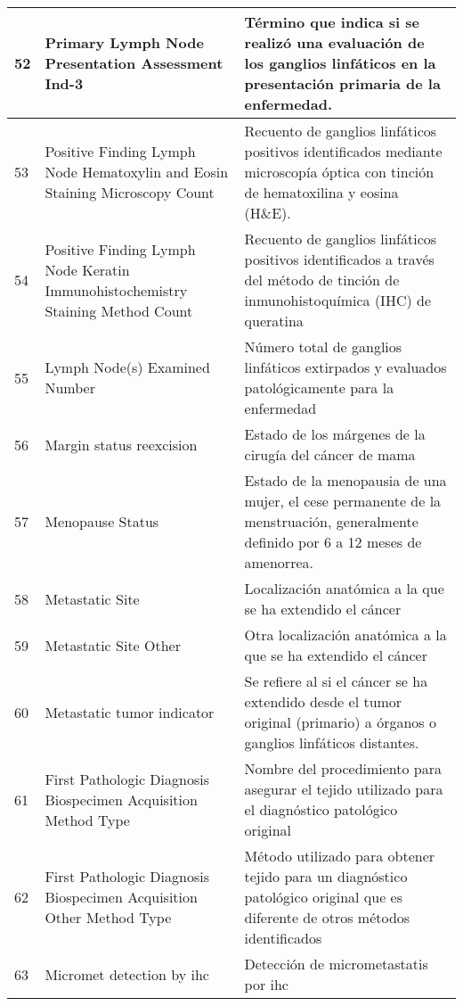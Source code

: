 \begin{table*} [!htb]
	\footnotesize
	\begin{threeparttable}
		\begin{tabular}{p{1cm} p{4cm} p{10cm}}
			\\ \hline	52	&	Primary Lymph Node Presentation Assessment Ind-3	&	Término que indica si se realizó una evaluación de los ganglios linfáticos en la presentación primaria de la enfermedad.
			\\ \hline	53	&	Positive Finding Lymph Node Hematoxylin and Eosin Staining Microscopy Count	&	Recuento de ganglios linfáticos positivos identificados mediante microscopía óptica con tinción de hematoxilina y eosina (H\&E).
			\\ \hline	54	&	Positive Finding Lymph Node Keratin Immunohistochemistry Staining Method Count	&	Recuento de ganglios linfáticos positivos identificados a través del método de tinción de inmunohistoquímica (IHC) de queratina
			\\ \hline	55	&	Lymph Node(s) Examined Number	&	Número total de ganglios linfáticos extirpados y evaluados patológicamente para la enfermedad
			\\ \hline	56	&	Margin status reexcision	&	Estado de los márgenes de la cirugía del cáncer de mama
			\\ \hline	57	&	Menopause Status	&	Estado de la menopausia de una mujer, el cese permanente de la menstruación, generalmente definido por 6 a 12 meses de amenorrea.
			\\ \hline	58	&	Metastatic Site	&	Localización anatómica a la que se ha extendido el cáncer
			\\ \hline	59	&	Metastatic Site Other	&	Otra localización anatómica a la que se ha extendido el cáncer
			\\ \hline	60	&	Metastatic tumor indicator	&	Se refiere al si el cáncer se ha extendido desde el tumor original (primario) a órganos o ganglios linfáticos distantes.
			\\ \hline	61	&	First Pathologic Diagnosis Biospecimen Acquisition Method Type	&	Nombre del procedimiento para asegurar el tejido utilizado para el diagnóstico patológico original
			\\ \hline	62	&	First Pathologic Diagnosis Biospecimen Acquisition Other Method Type	&	Método utilizado para obtener tejido para un diagnóstico patológico original que es diferente de otros métodos identificados
			\\ \hline	63	&	Micromet detection by ihc	&	Detección de micrometastatis por ihc

\end{tabular}
\end{threeparttable}
\end{table*}
